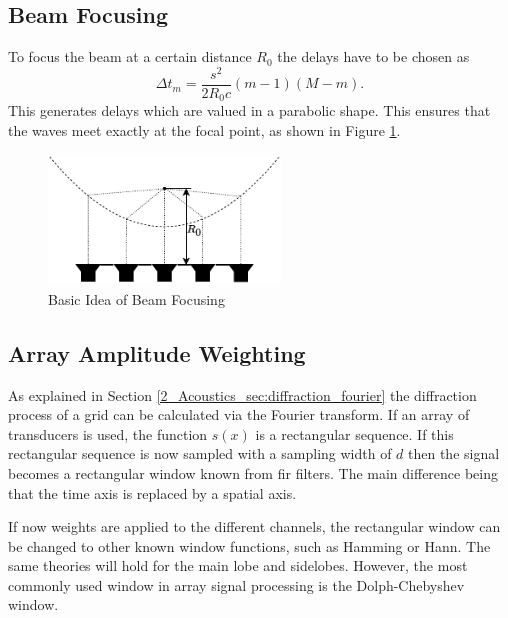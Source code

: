 \subsection{Beam Focusing}
To focus the beam at a certain distance $R_0$ the delays have to be chosen as
\begin{equation}
    \Delta t_m = \frac{s^2}{2R_0c}(m-1)(M-m).
\end{equation}
This generates delays which are valued in a parabolic shape. This ensures that the waves meet exactly at the focal point, as shown in Figure \ref{3_fig:beamfocusing}.
\begin{figure}[h!]
    \centering
    \includegraphics[width=0.55\textwidth]{images/3_Parametric_array/Beamfocusing.pdf}
    \caption{Basic Idea of Beam Focusing}
    \label{3_fig:beamfocusing}
\end{figure}

\subsection{Array Amplitude Weighting}
As explained in Section \ref{2_Acoustics_sec:diffraction_fourier} the diffraction process of a grid can be calculated via the Fourier transform. If an array of transducers is used, the function $s(x)$ is a rectangular sequence. If this rectangular sequence is now sampled with a sampling width of $d$ then the signal becomes a rectangular window known from \acrfull{fir} filters. The main difference being that the time axis is replaced by a spatial axis.

If now weights are applied to the different channels, the rectangular window can be changed to other known window functions, such as Hamming or Hann. The same theories will hold for the main lobe and sidelobes. However, the most commonly used window in array signal processing is the Dolph-Chebyshev window.  
